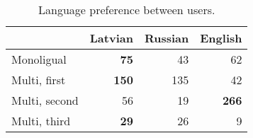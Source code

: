 \begin{table}[th]
  \centering
  \begin{tabular}{lrrr}
    \toprule
     & Latvian & Russian & English \\
    \midrule
    Monoligual     & \textbf{75} & 43 & 62  \\
    \addlinespace
    Multi, first   & \textbf{150} & 135 & 42  \\
    Multi, second  & 56 &  19 & \textbf{266}  \\
    Multi, third   & \textbf{29}  & 26 & 9  \\
    \bottomrule
  \end{tabular}
    \caption{Language preference between users.}
  \label{tab:language-use}
\end{table}